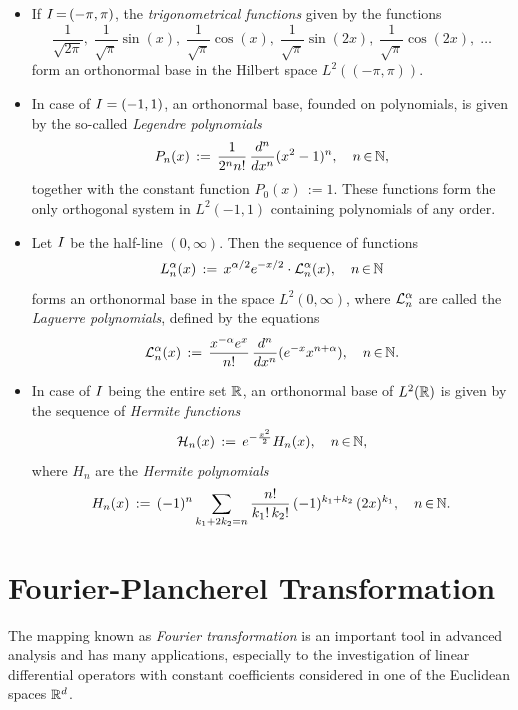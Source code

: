 \documentclass[11pt,twoside]{article}
\begin{document}
\begin{itemize}[leftmargin=12pt]
\item[1.]
If $\J \eq (-\pi,\pi)$,
the \textit{trigonometrical functions} given by the functions
\[
\frac{1}{\sqrt{2\pi}},         \;
\frac{1}{\sqrt{\pi}} \sin(x),  \;
\frac{1}{\sqrt{\pi}} \cos(x),  \;
\frac{1}{\sqrt{\pi}} \sin(2x), \;
\frac{1}{\sqrt{\pi}} \cos(2x), \; \dots
\]
form an orthonormal base in the Hilbert space $L^2((-\pi,\pi))$.

\item[2.]
In case of $\J=(-1,1)$,
an orthonormal base, founded on polynomials,
is given by the so-called \textit{Legendre polynomials}
\[
P_n(x)
\eqdef
\frac{1}{2^n n!} \, \frac{d^n}{dx^n} (x^2-1)^n,
\quad n \xeof \N,
\]
together with the constant function $P_0(x) \,{:=} 1$.
These functions form the only orthogonal system in $L^2(-1,1)$
containing polynomials of any order.

\item[3.]
Let $\J$ be the half-line $(0,\infty)$.
Then the sequence of functions
\[
L_n^{\alpha}(x)
\eqdef
x^{\alpha/2} e^{-x/2}
\cdot
\cal{L}_n^{\alpha}(x),
\quad n \xeof \N
\]
forms an orthonormal base in the space $L^2(0,\infty)$,
where $\cal{L}_n^{\alpha}$ are called the \textit{Laguerre polynomials},
defined by the equations
\[
\cal{L}_n^{\alpha}(x)
\eqdef
\frac{x^{-\alpha}e^x}{n!} \, \frac{d^n}{dx^n} (e^{-x}x^{n+\alpha}),
\quad n \xeof \N.
\]

\item[4.]
In case of $\J$ being the entire set $\R$,
an orthonormal base of $L^2(\R)$ is given by the sequence
of \textit{Hermite functions}
\[
\cal{H}_n(x) \eqdef e^{-\frac{x^2}{2}} H_n(x),
\quad n \xeof \N,
\]
where $H_n$ are the \textit{Hermite polynomials}
\[
{H}_n(x)
\eqdef
(-1)^n \sum_{k_1+2k_2=n}
\frac{n!}{k_1! \, k_2!}
\,
(-1)^{k_1+k_2} \, (2x)^{k_1},
\quad n \xeof \N.
\]
\end{itemize}

\section{Fourier-Plancherel Transformation}
The mapping known as \textit{Fourier transformation}
is an important tool in advanced analysis
and has many applications,
especially to the investigation of
linear differential operators with constant coefficients
considered in one of the Euclidean spaces $\Rd$.
\end{document}
